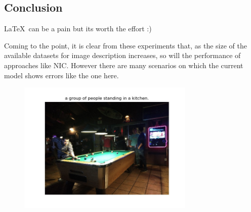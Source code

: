 \subsection{Conclusion}
\LaTeX\ can be a pain but its worth the effort :)

Coming to the point, it is clear from these experiments that, as the size of the available datasets for image description increases, so will the performance of approaches like NIC. However there are many scenarios on which the current model shows errors like the one here.
\begin{figure}[h!]
\includegraphics[width=0.75\textwidth]{assets/eg/err1_out.jpg}
\end{figure}



